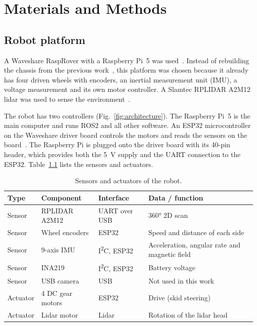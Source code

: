 \chapter{Materials and Methods}
\label{ch:methods}

\section{Robot platform}
\label{sec:platform}

A Waveshare RaspRover with a Raspberry Pi~5 was used~\citep{waveshare_rasprover}. Instead of rebuilding the chassis from the previous work~\citep{graham2024}, this platform was chosen because it already has four driven wheels with encoders, an inertial measurement unit (IMU), a voltage measurement and its own motor controller. A Slamtec RPLIDAR A2M12 lidar was used to sense the environment~\citep{slamtec_a2m12}.

The robot has two controllers (Fig.~\ref{fig:architecture}). The Raspberry Pi~5 is the main computer and runs ROS2 and all other software. An ESP32 microcontroller on the Waveshare driver board controls the motors and reads the sensors on the board~\citep{waveshare_driver}. The Raspberry Pi is plugged onto the driver board with its 40-pin header, which provides both the \SI{5}{\volt} supply and the UART connection to the ESP32. Table~\ref{tab:components} lists the sensors and actuators.



\begin{table}[H]
  \centering
  \small
  \caption{Sensors and actuators of the robot.}
  \label{tab:components}
  \begin{tabularx}{\textwidth}{@{}l l l X@{}}
    \toprule
    \textbf{Type} & \textbf{Component} & \textbf{Interface} & \textbf{Data / function} \\
    \midrule
    Sensor   & RPLIDAR A2M12             & UART over USB   & 360° 2D scan~\citep{slamtec_a2m12} \\
    Sensor   & Wheel encoders            & ESP32           & Speed and distance of each side \\
    Sensor   & 9-axis IMU                & I\textsuperscript{2}C, ESP32 & Acceleration, angular rate and magnetic field~\citep{waveshare_driver} \\
    Sensor   & INA219                    & I\textsuperscript{2}C, ESP32 & Battery voltage~\citep{waveshare_driver} \\
    Sensor   & USB camera                & USB             & Not used in this work \\
    Actuator & 4 DC gear motors          & ESP32           & Drive (skid steering) \\
    Actuator & Lidar motor               & Lidar           & Rotation of the lidar head \\
    \bottomrule
  \end{tabularx}
\end{table}

